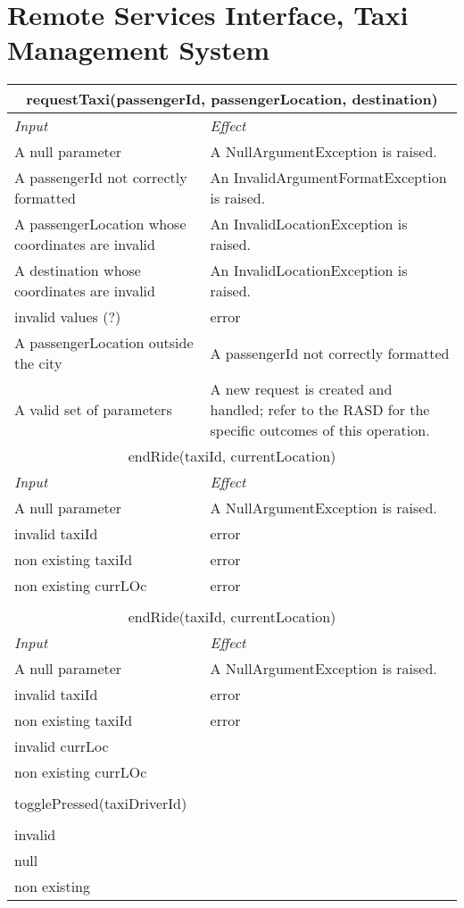 \documentclass[11pt,oneside,a4paper]{report}
\newcommand{\method}[1]{\multicolumn{2}{|c|}{{#1}}\\\hline
	\textit{Input} & \textit{Effect} \\\hline}
\begin{document}
\section{Remote Services Interface, Taxi Management System}
\begin{tabular}{p{5cm}|p{6cm}}
	\hline
	\method{requestTaxi(passengerId, passengerLocation, destination)}
	A null parameter &
	A NullArgumentException is raised.\\\hline
	A passengerId not correctly formatted &
	An InvalidArgumentFormatException is raised. \\\hline
	A passengerLocation whose coordinates are invalid &
	An InvalidLocationException is raised. \\\hline
	A destination whose coordinates are invalid &
	An InvalidLocationException is raised. \\\hline
	invalid values (?) &
	error \\\hline
	A passengerLocation outside the city &
	A passengerId not correctly formatted \\\hline
	A valid set of parameters &
	A new request is created and handled; refer to the RASD for the specific outcomes of this operation. \\\hline\hline
	
	\method{endRide(taxiId, currentLocation)}
	A null parameter &
	A NullArgumentException is raised. \\\hline
		invalid taxiId &
	error \\\hline
	
		non existing taxiId &
	error \\\hline

				non existing currLOc &
	error \\\hline\\\hline

	\method{endRide(taxiId, currentLocation)}
	A null parameter &
	A NullArgumentException is raised. \\\hline
	
				invalid taxiId &
		error \\\hline
		
						non existing taxiId &
			error \\\hline

	invalid currLoc\\\hline
	non existing currLOc\\\hline\\\hline
	 togglePressed(taxiDriverId)\\\hline\\
	invalid\\\hline
	null\\\hline
	non existing\\\hline
	
\end{tabular}
\end{document}
